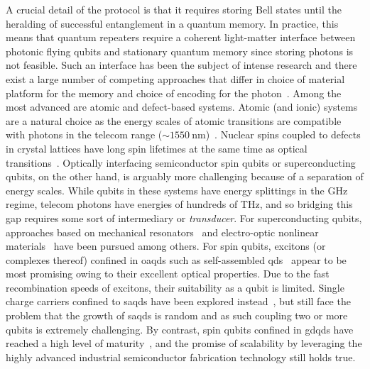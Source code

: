 A crucial detail of the protocol is that it requires storing Bell states until the heralding of successful entanglement in a quantum memory.
In practice, this means that quantum repeaters require a coherent light-matter interface between photonic flying qubits and stationary quantum memory since storing photons is not feasible.
Such an interface has been the subject of intense research and there exist a large number of competing approaches that differ in choice of material platform for the memory and choice of encoding for the photon~\cite{Awschalom2018,Beukers2024}.
Among the most advanced are atomic and defect-based systems.
Atomic (and ionic) systems are a natural choice as the energy scales of atomic transitions are compatible with photons in the telecom range ($\sim\qty{1550}{\nano\meter}$)~\cite{Sangouard2011,Covey2023,Krutyanskiy2023,Liu2024,Kucera2024}.
Nuclear spins coupled to defects in crystal lattices have long spin lifetimes at the same time as optical transitions~\cite{Togan2010,Nguyen2019,Bergeron2020,Stolk2024,Knaut2024}.
Optically interfacing semiconductor spin qubits
or superconducting qubits, on the other hand, is arguably more challenging because of a separation of energy scales.
While qubits in these systems have energy splittings in the \unit{\giga\hertz} regime, telecom photons have energies of hundreds of \unit{\tera\hertz}, and so bridging this gap requires some sort of intermediary or \emph{transducer}.
For superconducting qubits, approaches based on mechanical resonators~\cite{Mirhosseini2020} and electro-optic nonlinear materials~\cite{Wang2022} have been pursued among others.
For spin qubits, excitons (or complexes thereof) confined in \glspl{oaqd} such as self-assembled \glspl{qd}~\cite{Stranski1937,Koguchi1991,Koguchi1993,NobuyukiKoguchi1993} appear to be most promising owing to their excellent optical properties.
Due to the fast recombination speeds of excitons, their suitability as a qubit is limited.
Single charge carriers confined to \glspl{saqd} have been explored instead~\cite{Warburton2013}, but still face the problem that the growth of \glspl{saqd} is random and as such coupling two or more qubits is extremely challenging.
By contrast, spin qubits confined in \glspl{gdqd} have reached a high level of maturity~\cite{Burkard2023,Stano2025}, and the promise of scalability by leveraging the highly advanced industrial semiconductor fabrication technology still holds true.

